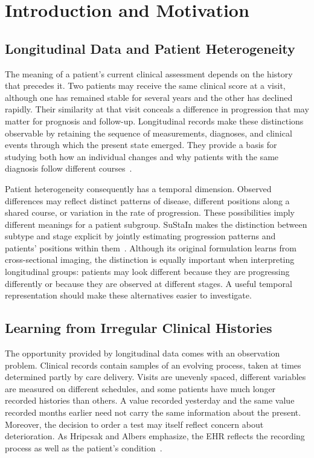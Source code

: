 \chapter{Introduction and Motivation}
\label{chap:introduction}

\section{Longitudinal Data and Patient Heterogeneity}
\label{sec:patient-heterogeneity}

The meaning of a patient's current clinical assessment depends on the history that precedes it. Two patients may receive the same clinical score at a visit, although one has remained stable for several years and the other has declined rapidly. Their similarity at that visit conceals a difference in progression that may matter for prognosis and follow-up. Longitudinal records make these distinctions observable by retaining the sequence of measurements, diagnoses, and clinical events through which the present state emerged. They provide a basis for studying both how an individual changes and why patients with the same diagnosis follow different courses~\cite{lee2021odtp}.

Patient heterogeneity consequently has a temporal dimension. Observed differences may reflect distinct patterns of disease, different positions along a shared course, or variation in the rate of progression. These possibilities imply different meanings for a patient subgroup. SuStaIn makes the distinction between subtype and stage explicit by jointly estimating progression patterns and patients' positions within them~\cite{young2018sustain}. Although its original formulation learns from cross-sectional imaging, the distinction is equally important when interpreting longitudinal groups: patients may look different because they are progressing differently or because they are observed at different stages. A useful temporal representation should make these alternatives easier to investigate.

\section{Learning from Irregular Clinical Histories}

The opportunity provided by longitudinal data comes with an observation problem. Clinical records contain samples of an evolving process, taken at times determined partly by care delivery. Visits are unevenly spaced, different variables are measured on different schedules, and some patients have much longer recorded histories than others. A value recorded yesterday and the same value recorded months earlier need not carry the same information about the present. Moreover, the decision to order a test may itself reflect concern about deterioration. As Hripcsak and Albers emphasize, the EHR reflects the recording process as well as the patient's condition~\cite{hripcsak2013phenotyping}.

